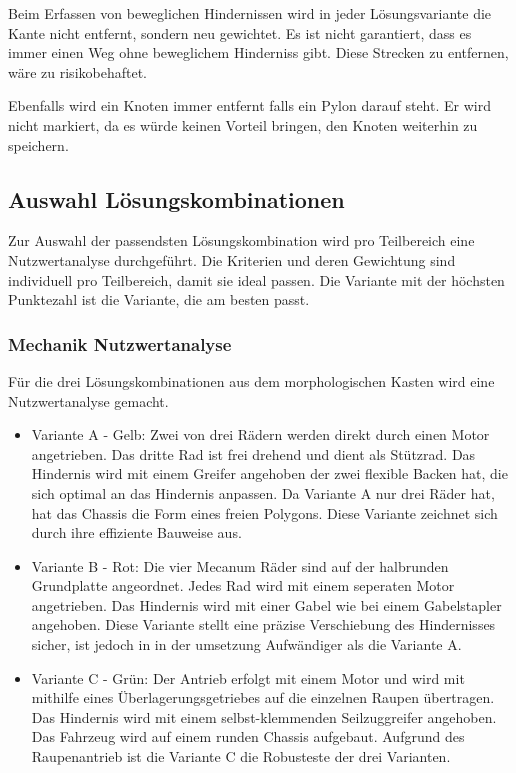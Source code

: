 Beim Erfassen von beweglichen Hindernissen wird in jeder Lösungsvariante die Kante nicht entfernt, sondern neu gewichtet. Es ist nicht garantiert, dass es immer einen Weg ohne beweglichem Hinderniss gibt. Diese Strecken zu entfernen, wäre zu risikobehaftet.

Ebenfalls wird ein Knoten immer entfernt falls ein Pylon darauf steht. Er wird nicht markiert, da es würde keinen Vorteil bringen, den Knoten weiterhin zu speichern.


\newpage
\subsection*{Auswahl Lösungskombinationen}\label{nutzwertanalyse}


Zur Auswahl der passendsten Lösungskombination wird pro Teilbereich eine Nutzwertanalyse durchgeführt. Die Kriterien und deren Gewichtung sind individuell pro Teilbereich, damit sie ideal passen. Die Variante mit der höchsten Punktezahl ist die Variante, die am besten passt.

\subsubsection*{Mechanik Nutzwertanalyse}


Für die  drei Lösungskombinationen aus dem morphologischen Kasten wird eine Nutzwertanalyse gemacht.    

\begin{itemize}
    \item Variante A - Gelb: Zwei von drei Rädern werden direkt durch einen Motor angetrieben. Das dritte Rad ist frei drehend und dient als Stützrad. Das Hindernis wird mit einem Greifer angehoben der zwei flexible Backen hat, die sich optimal an das Hindernis anpassen. Da Variante A nur drei Räder hat, hat das Chassis die Form eines freien Polygons. Diese Variante zeichnet sich durch ihre effiziente Bauweise aus. 
    \item Variante B - Rot: Die vier Mecanum Räder sind auf der halbrunden Grundplatte angeordnet. Jedes Rad wird mit einem seperaten Motor angetrieben.  Das Hindernis wird mit einer Gabel wie bei einem Gabelstapler angehoben. Diese Variante stellt eine präzise Verschiebung des Hindernisses sicher, ist jedoch in in der umsetzung Aufwändiger als die Variante A. 
    \item Variante C - Grün: Der Antrieb erfolgt mit einem Motor und wird mit mithilfe eines Überlagerungsgetriebes auf die einzelnen Raupen übertragen.  Das Hindernis wird mit einem selbst-klemmenden Seilzuggreifer angehoben. Das Fahrzeug wird auf einem runden Chassis aufgebaut. Aufgrund des Raupenantrieb ist die Variante C die Robusteste der drei Varianten. 
\end{itemize}

